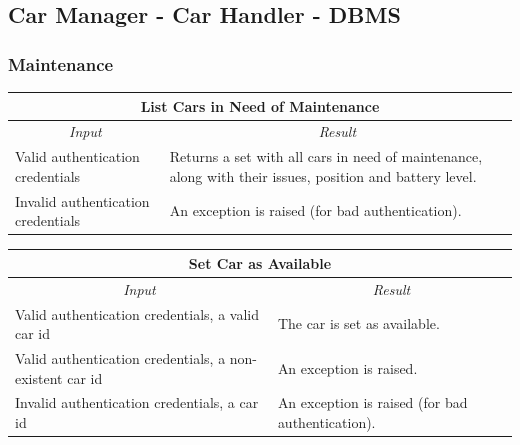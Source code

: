 \documentclass[english]{article}
\begin{document}
\subsection{Car Manager - Car Handler - DBMS}

\subsubsection{Maintenance}
\begin{center}
	\begin{tabular}{ | p{6cm} | p{6cm} | }
		\hline 
		\multicolumn{2}{|c|}{\textbf{List Cars in Need of Maintenance}} \\
		\hline
		\multicolumn{1}{|c|}{\textit{Input}} & \multicolumn{1}{c|}{\textit{Result}} \\
		\hline
		Valid authentication credentials & Returns a set with all cars in need of maintenance, along with their issues, position and battery level. \\
		\hline
		Invalid authentication credentials & An exception is raised (for bad authentication). \\
		\hline
	\end{tabular}
\end{center}

\begin{center}
	\begin{tabular}{ | p{6cm} | p{6cm} | }
		\hline
		\multicolumn{2}{|c|}{\textbf{Set Car as Available}} \\
		\hline
		\multicolumn{1}{|c|}{\textit{Input}} & \multicolumn{1}{c|}{\textit{Result}} \\
		\hline
		Valid authentication credentials, a valid car id & The car is set as available. \\
		\hline
		Valid authentication credentials, a non-existent car id & An exception is raised. \\
		\hline
		Invalid authentication credentials, a car id & An exception is raised (for bad authentication). \\
		\hline
	\end{tabular}
\end{center}
\end{document}
